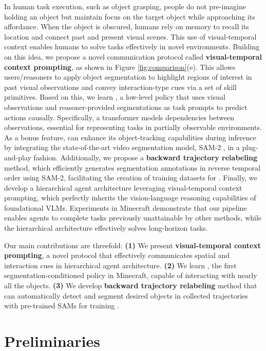 \documentclass[11pt, a4paper, logo, two column]{craftjarvis}
\begin{document}
In human task execution, such as object grasping, people do not pre-imagine holding an object but maintain focus on the target object while approaching its affordance. When the object is obscured, humans rely on memory to recall its location and connect past and present visual scenes. This use of visual-temporal context enables humans to solve tasks effectively in novel environments. 
Building on this idea, we propose a novel communication protocol called \textbf{visual-temporal context prompting}, as shown in Figure \ref{fig:comparison}(e). This allows users/reasoners to apply object segmentation to highlight regions of interest in past visual observations and convey interaction-type cues via a set of skill primitives. Based on this, we learn \textbf{\agent}, a low-level policy that uses visual observations and reasoner-provided segmentations as task prompts to predict actions causally. Specifically, a transformer \citep{transformerxl} models dependencies between observations, essential for representing tasks in partially observable environments. As a bonus feature, \agent can enhance its object-tracking capabilities during inference by integrating the state-of-the-art video segmentation model, SAM-2 \citep{sam2}, in a plug-and-play fashion. Additionally, we propose a \textbf{backward trajectory relabeling} method, which efficiently generates segmentation annotations in reverse temporal order using SAM-2, facilitating the creation of training datasets for \agent. 
Finally, we develop a hierarchical agent architecture leveraging visual-temporal context prompting, which perfectly inherits the vision-language reasoning capabilities of foundational VLMs. Experiments in Minecraft demonstrate that our pipeline enables agents to complete tasks previously unattainable by other methods, while the hierarchical architecture effectively solves long-horizon tasks. 

Our main contributions are threefold:
\textbf{(1)} We present \textbf{visual-temporal context prompting}, a novel protocol that effectively communicates spatial and interaction cues in hierarchical agent architecture. 
\textbf{(2)} We learn \textbf{\agent}, the first segmentation-conditioned policy in Minecraft, capable of interacting with nearly all the objects. 
\textbf{(3)} We develop \textbf{backward trajectory relabeling} method that can automatically detect and segment desired objects in collected trajectories with pre-trained SAMs for training \agent. 




\section{Preliminaries}
\label{sec:preliminaries}
\end{document}
